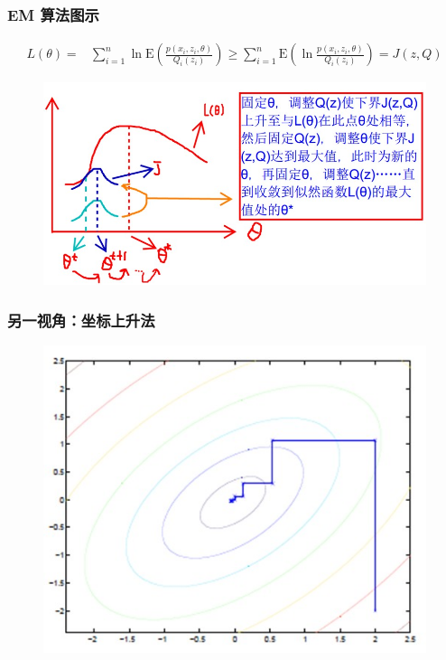 \documentclass{beamer}
\def\E{\mathrm{E}}
\newcommand{\Gh}{\theta}
\begin{document}
\begin{frame}
    \frametitle{EM 算法图示}

    \[\begin{split}
        L(\Gh) = & \sum_{i = 1}^{n}\ln \E(\frac{p(x_i, z_i, \Gh)}{Q_i(z_i)}) \geq \sum_{i = 1}^{n} \E(\ln \frac{p(x_i, z_i, \Gh)}{Q_i(z_i)}) = J(z, Q)
    \end{split}\]
    
    \begin{figure}
        \centering
        \includegraphics[width=.8\textwidth]{res/em_function.png}
    \end{figure}

\end{frame}

\begin{frame}
    \frametitle{另一视角：坐标上升法}

    \begin{figure}
        \centering
        \includegraphics[width=.7\textwidth]{res/coordinate_ascent.png}
    \end{figure}

\end{frame}
\end{document}

